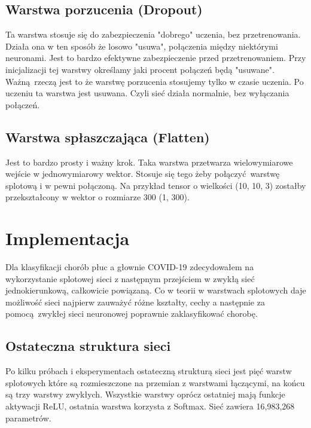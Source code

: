 \documentclass{article}
\begin{document}
\subsection{Warstwa porzucenia (Dropout)}
Ta warstwa stosuje się do zabezpieczenia "dobrego" uczenia, bez przetrenowania. Działa ona w ten sposób że losowo "usuwa",  połączenia między niektórymi neuronami. Jest to bardzo efektywne zabezpieczenie przed przetrenowaniem. Przy inicjalizacji tej warstwy określamy jaki procent połączeń będą "usuwane". Ważną rzeczą jest to że warstwę porzucenia stosujemy tylko w czasie uczenia. Po uczeniu ta warstwa jest usuwana. Czyli sieć działa normalnie, bez wyłączania połączeń. \cite{jak_dziawaja_cnn}


\subsection{Warstwa spłaszczająca (Flatten)}
Jest to bardzo prosty i ważny krok. Taka warstwa przetwarza wielowymiarowe wejście w jednowymiarowy wektor. Stosuje się tego żeby połączyć warstwę splotową i w pewni połączoną. Na przykład tensor o wielkości (10, 10, 3) zostałby przekształcony w wektor o rozmiarze 300 (1, 300). \cite{jak_dziawaja_cnn}

\section{Implementacja}
Dla klasyfikacji chorób płuc a głownie COVID-19 zdecydowałem na wykorzystanie splotowej sieci z następnym przejściem w zwykłą sieć jednokierunkową, całkowicie powiązaną. Co w teorii w warstwach splotowych daje możliwość sieci najpierw zauważyć różne kształty, cechy a następnie za pomocą zwykłej sieci neuronowej poprawnie zaklasyfikować chorobę.

\subsection{Ostateczna struktura sieci}
Po kilku próbach i eksperymentach ostateczną strukturą sieci jest pięć warstw splotowych które są rozmieszczone na przemian z warstwami łączącymi, na końcu są trzy warstwy zwykłych. Wszystkie warstwy oprócz ostatniej mają funkcje aktywacji ReLU, ostatnia warstwa korzysta z Softmax. Sieć zawiera 16,983,268 parametrów.\\
\end{document}
